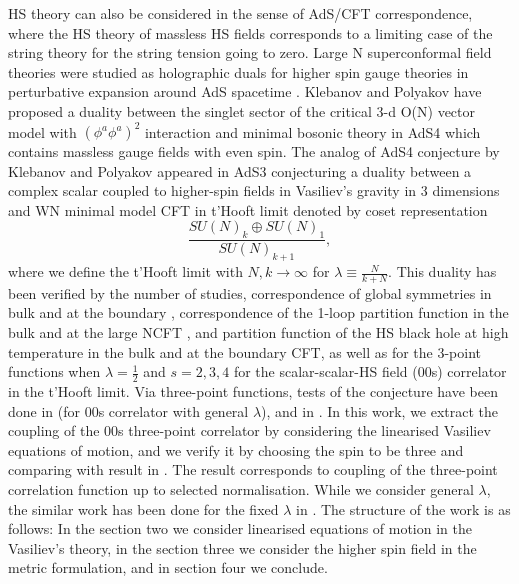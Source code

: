 \documentclass[prd,superscriptaddress,twocolumn,10pt]{revtex4}
\begin{document}
HS theory can also be considered in the sense of AdS/CFT correspondence, where the HS theory of massless HS fields corresponds to a limiting case of the string theory for the string tension going to zero. Large N superconformal field theories were studied as holographic duals for higher spin gauge theories in perturbative expansion around AdS spacetime .
Klebanov and Polyakov  have proposed a duality  between the singlet sector of the critical 3-d O(N) vector model with $(\phi^a\phi^a)^2$ interaction and minimal bosonic theory in AdS4 which contains massless gauge fields with even spin. The analog of AdS4 conjecture by Klebanov and Polyakov appeared in AdS3  conjecturing a duality between a complex scalar coupled to higher-spin fields in Vasiliev's gravity in 3 dimensions and WN minimal model CFT in t'Hooft limit denoted by coset representation
 \begin{equation}
\frac{SU(N)_k\oplus SU(N)_1}{SU(N)_{k+1}},
\end{equation}
where we define the t'Hooft limit with $N,k\rightarrow\infty$ for $\lambda\equiv\frac{N}{k+N}$. 
This duality has been verified by the number of studies, correspondence of global symmetries in bulk and at the boundary , correspondence of the 1-loop partition function in the bulk and at the large NCFT  , and partition function of the HS black hole at high temperature in the bulk and at the boundary CFT, as well as for the 3-point functions when $\lambda=\frac{1}{2}$ and $s=2,3,4$ for the scalar-scalar-HS field (00s) correlator in the t'Hooft limit. 
Via three-point functions, tests of the conjecture have been done in  (for 00s correlator with general $\lambda$), and in .
In this work, we extract the coupling of the 00s  three-point correlator  by considering the linearised Vasiliev equations of motion, and we verify it by choosing the spin to be three and comparing with result in .
The result corresponds to coupling of the three-point correlation function up to selected normalisation. 
While we consider general $\lambda$, the similar work has been done for the fixed $\lambda$ in .
The structure of the work is as follows: In the section two we consider linearised equations of motion in the Vasiliev's theory, in the section three we consider the higher spin field in the metric formulation, and in section four we conclude.
\end{document}
